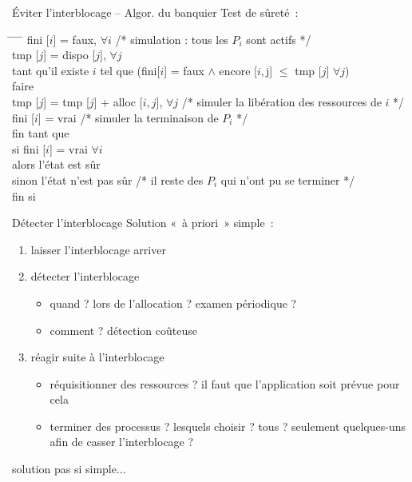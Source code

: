 \begin {frame} {Éviter l'interblocage -- Algor. du banquier}
    Test de sûreté~:

    \footnotesize
    \begin {tabbing}
	\hspace* {3mm} \= \hspace* {3mm} \= \hspace* {3mm} \=
		\hspace* {40mm} \= \kill
	fini [$i$] = faux, $\forall i$
	    \> \> \> \> /* simulation : tous les $P_i$ sont actifs */
	    \\
	tmp [$j$] = dispo [$j$], $\forall j$ \\
	tant qu'il existe $i$ tel que
	    (fini[$i$] = faux $\wedge$
		encore [$i,$j] $\leq$ tmp [$j$] $\forall j$) \\
	faire \\
	\> tmp [$j$] = tmp [$j$] + alloc [$i,j$], $\forall j$
	    \> \> \> /* simuler la libération des ressources de $i$ */
	    \\
	\> fini [$i$] = vrai
	    \> \> \> /* simuler la terminaison de $P_i$ */
	    \\
	fin tant que \\
	si fini [$i$] = vrai $\forall i$ \\
	alors l'état est sûr \\
	sinon l'état n'est pas sûr
	    \> \> \> \> /* il reste des $P_i$ qui n'ont pu se terminer */
	    \\
	fin si
    \end {tabbing}
\end {frame}


\begin {frame} {Détecter l'interblocage}
    Solution «~à priori~» simple~:

    \begin {enumerate}
	\item laisser l'interblocage arriver
	\item détecter l'interblocage
	    \begin {itemize}
		\item quand ? lors de l'allocation ? examen périodique ?
		\item comment ? détection coûteuse
	    \end {itemize}
	\item réagir suite à l'interblocage
	    \begin {itemize}
		\item réquisitionner des ressources ? il faut que
		    l'application soit prévue pour cela

		\item terminer des processus ? lesquels choisir ? tous
		    ? seulement quelques-uns afin de casser l'interblocage ?

	    \end {itemize}
    \end {enumerate}

    \implique solution pas si simple...

\end {frame}
